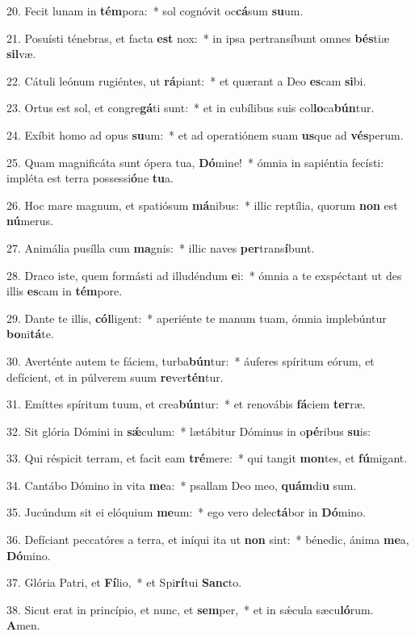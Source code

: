 20. Fecit lunam in \textbf{tém}pora:~*  sol cognóvit oc\textbf{cá}sum \textbf{su}um.\

21. Posuísti ténebras, et facta \textbf{est} nox:~*  in ipsa pertransíbunt omnes \textbf{bés}tiæ \textbf{sil}væ.\

22. Cátuli leónum rugiéntes, ut \textbf{rá}piant:~*  et quærant a Deo \textbf{es}cam \textbf{si}bi.\

23. Ortus est sol, et congre\textbf{gá}ti sunt:~*  et in cubílibus suis col\textbf{lo}ca\textbf{bún}tur.\

24. Exíbit homo ad opus \textbf{su}um:~*  et ad operatiónem suam \textbf{us}que ad \textbf{vés}perum.\

25. Quam magnificáta sunt ópera tua, \textbf{Dó}mine!~*  ómnia in sapiéntia fecísti: impléta est terra possessi\textbf{ó}ne \textbf{tu}a.\

26. Hoc mare magnum, et spatiósum \textbf{má}nibus:~*  illic reptília, quorum \textbf{non} est \textbf{nú}merus.\

27. Animália pusílla cum \textbf{ma}gnis:~*  illic naves \textbf{per}trans\textbf{í}bunt.\

28. Draco iste, quem formásti ad illudéndum \textbf{e}i:~*  ómnia a te exspéctant ut des illis \textbf{es}cam in \textbf{tém}pore.\

29. Dante te illis, \textbf{cól}ligent:~*  aperiénte te manum tuam, ómnia implebúntur \textbf{bo}ni\textbf{tá}te.\

30. Averténte autem te fáciem, turba\textbf{bún}tur:~*  áuferes spíritum eórum, et defícient, et in púlverem suum \textbf{re}ver\textbf{tén}tur.\

31. Emíttes spíritum tuum, et crea\textbf{bún}tur:~*  et renovábis \textbf{fá}ciem \textbf{ter}ræ.\

32. Sit glória Dómini in \textbf{sǽ}culum:~*  lætábitur Dóminus in o\textbf{pé}ribus \textbf{su}is:\

33. Qui réspicit terram, et facit eam \textbf{tré}mere:~*  qui tangit \textbf{mon}tes, et \textbf{fú}migant.\

34. Cantábo Dómino in vita \textbf{me}a:~*  psallam Deo meo, \textbf{quám}di\textbf{u} sum.\

35. Jucúndum sit ei elóquium \textbf{me}um:~*  ego vero delec\textbf{tá}bor in \textbf{Dó}mino.\

36. Defíciant peccatóres a terra, et iníqui ita ut \textbf{non} sint:~*  bénedic, ánima \textbf{me}a, \textbf{Dó}mino.\

37. Glória Patri, et \textbf{Fí}lio,~*  et Spi\textbf{rí}tui \textbf{Sanc}to.\

38. Sicut erat in princípio, et nunc, et \textbf{sem}per,~*  et in sǽcula sæcu\textbf{ló}rum. \textbf{A}men.\

